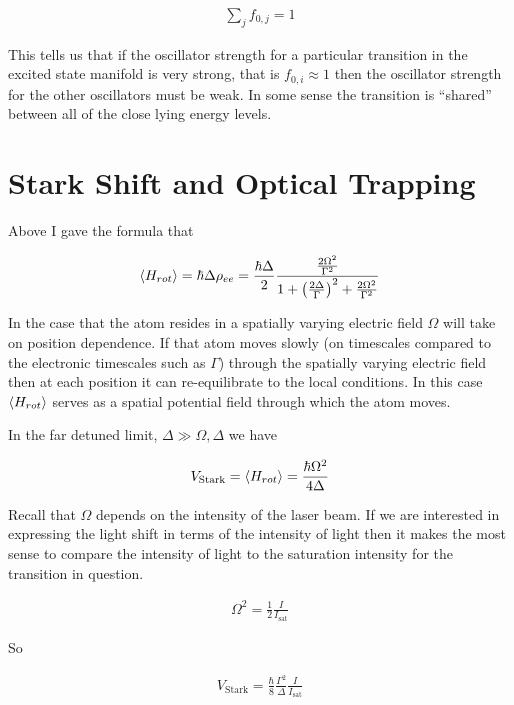 \documentclass[12pt]{article}
\begin{document}
\begin{align}
\sum_{j} f_{0,j} = 1
\end{align}

This tells us that if the oscillator strength for a particular transition in the excited state manifold is very strong, that is $f_{0,i} \approx 1$ then the oscillator strength for the other oscillators must be weak. In some sense the transition is ``shared'' between all of the close lying energy levels.

\section{Stark Shift and Optical Trapping}

Above I gave the formula that

\begin{align}
\Braket{H_{rot}} = \hbar \Delta \rho_{ee} = \frac{\hbar \Delta}{2} \frac{\frac{2\Omega^2}{\Gamma^2}}{1 + \left( \frac{2 \Delta}{\Gamma}\right)^2 + \frac{2\Omega^2}{\Gamma^2}}
\end{align}

In the case that the atom resides in a spatially varying electric field $\Omega$ will take on position dependence. If that atom moves slowly (on timescales compared to the electronic timescales such as $\Gamma$) through the spatially varying electric field then at each position it can re-equilibrate to the local conditions. In this case $\Braket{H_{rot}}$ serves as a spatial potential field through which the atom moves.

In the far detuned limit, $\Delta \gg \Omega, \Delta$ we have

\begin{align}
V_{\text{Stark}} = \Braket{H_{rot}} = \frac{\hbar \Omega^2}{4\Delta}
\end{align}

Recall that $\Omega$ depends on the intensity of the laser beam. If we are interested in expressing the light shift in terms of the intensity of light then it makes the most sense to compare the intensity of light to the saturation intensity for the transition in question.

\begin{align}
\Omega^2 = \frac{1}{2} \frac{I}{I_{\text{sat}}}
\end{align}

So

\begin{align}
V_{\text{Stark}} = \frac{\hbar}{8} \frac{\Gamma^2}{\Delta} \frac{I}{I_{\text{sat}}}
\end{align}
\end{document}
